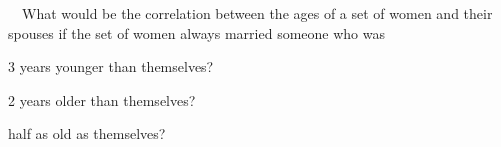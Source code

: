  \ \ What would be the 
correlation between the ages of a set of women and their spouses if the set of women always married someone who was
\begin{parts}
\item 3 years younger than themselves? 
\item 2 years older than themselves? 
\item half as old as themselves?
\end{parts}
